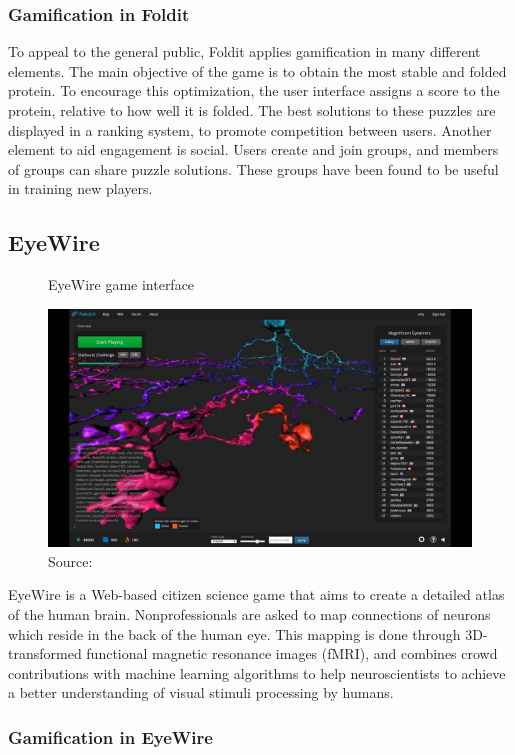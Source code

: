 \subsubsection{Gamification in Foldit}

To appeal to the general public, Foldit applies gamification in many different elements. The main objective of the game is to obtain the most stable and folded protein. To encourage this optimization, the user interface assigns a score to the protein, relative to how well it is folded. The best solutions to these puzzles are displayed in a ranking system, to promote competition between users. Another element to aid engagement is social. Users create and join groups, and members of groups can share puzzle solutions. These groups have been found to be useful in training new players.

\subsection{EyeWire}

\begin{figure}[ht]
    \centering
    \caption{EyeWire game interface}
    \includegraphics[width=0.8\linewidth]{images/background/eyewire.jpg}
    \caption*{Source: \cite{eyewire2014how}}
    \label{fig:eyewire-game-interface}
\end{figure}

EyeWire is a Web-based citizen science game that aims to create a detailed atlas of the human brain. Nonprofessionals are asked to map connections of neurons which reside in the back of the human eye. This mapping is done through 3D-transformed functional magnetic resonance images (fMRI), and combines crowd contributions with machine learning algorithms to help neuroscientists to achieve a better understanding of visual stimuli processing by humans.

\subsubsection{Gamification in EyeWire}

